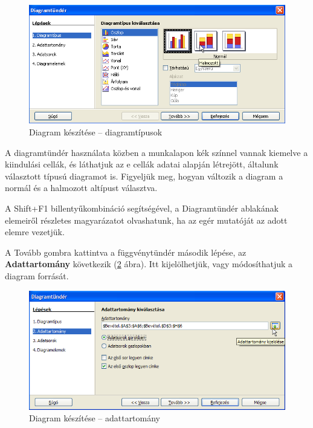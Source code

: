 \begin{figure}[!h]
\begin{center}
\includegraphics[width=15.999cm]{oocalcv1-img53.png}
\caption{Diagram készítése --  diagramtípusok}\label{DiagramTípus}
\end{center}
\end{figure}

A diagramtündér használata közben a munkalapon kék színnel
vannak kiemelve a kiindulási cellák, és láthatjuk az e cellák
adatai alapján létrejött, általunk választott típusú
diagramot is. Figyeljük meg, hogyan változik a diagram a normál
és a halmozott altípust választva. 

A Shift+F1 billentyűkombináció segítségével, a
Diagramtündér ablakának elemeiről részletes magyarázatot
olvashatunk, ha az egér mutatóját az adott elemre vezetjük.

A Tovább gombra kattintva a függvénytündér második
lépése, az \textbf{Adattartomány} következik (\ref{DiagramAdat} ábra).
 Itt kijelölhetjük, vagy módosíthatjuk a diagram forrását.

\begin{figure}[!h]
\begin{center}
\includegraphics[width=15.999cm]{oocalcv1-img54.png}
\caption{Diagram készítése --  adattartomány}\label{DiagramAdat}
\end{center}
\end{figure}

